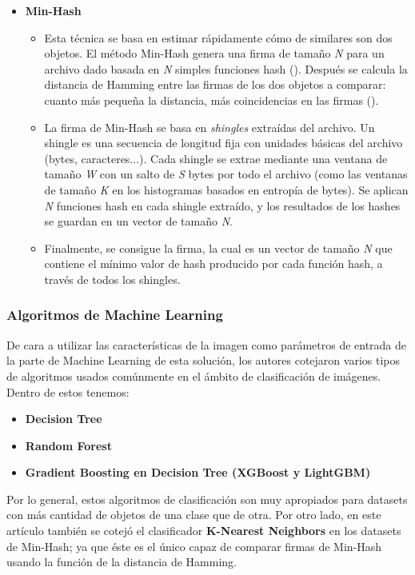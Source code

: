 \begin{itemize}
\begin{itemize}
\end{itemize}
\item \textbf{Min-Hash}
\begin{itemize}
\item Esta técnica se basa en estimar rápidamente cómo de similares son dos objetos. El método Min-Hash genera una firma de tamaño \textit{N} para un archivo dado basada en \textit{N} simples funciones hash (\cite{min-hash}). Después se calcula la distancia de Hamming entre las firmas de los dos objetos a comparar: cuanto más pequeña la distancia, más coincidencias en las firmas (\cite{hamming}). %
\item La firma de Min-Hash se basa en \textit{shingles} extraídas del archivo. Un shingle es una secuencia de longitud fija con unidades básicas del archivo (bytes, caracteres...). Cada shingle se extrae mediante una ventana de tamaño \textit{W} con un salto de \textit{S} bytes por todo el archivo (como las ventanas de tamaño \textit{K} en los histogramas basados en entropía de bytes). Se aplican \textit{N} funciones hash en cada shingle extraído, y los resultados de los hashes se guardan en un vector de tamaño \textit{N}.
\item Finalmente, se consigue la firma, la cual es un vector de tamaño \textit{N} que contiene el mínimo valor de hash producido por cada función hash, a través de todos los shingles.
\end{itemize}
\end{itemize}

\subsubsection{Algoritmos de Machine Learning}

De cara a utilizar las características de la imagen como parámetros de entrada de la parte de Machine Learning de esta solución, los autores cotejaron varios tipos de algoritmos usados comúnmente en el ámbito de clasificación de imágenes. Dentro de estos tenemos:

\begin{itemize}
\item \textbf{Decision Tree}
\item \textbf{Random Forest}
\item \textbf{Gradient Boosting en Decision Tree (XGBoost y LightGBM)}
\end{itemize}

Por lo general, estos algoritmos de clasificación son muy apropiados para datasets con más cantidad de objetos de una clase que de otra. Por otro lado, en este artículo también se cotejó el clasificador \textbf{K-Nearest Neighbors} en los datasets de Min-Hash; ya que éste es el único capaz de comparar firmas de Min-Hash usando la función de la distancia de Hamming.

